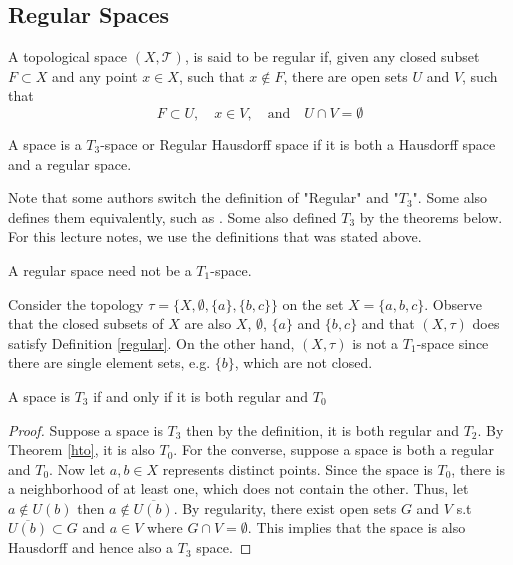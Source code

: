 \documentclass[12pt]{article} %
\begin{document}
\subsection{Regular Spaces}

\begin{definition}  \label{regular}\parencite{milewski1994topology}
    A topological space $(X, \mathcal{T})$, is said to be regular if, given any closed subset $F \subset X$ and any point $x \in X$, such that $x \notin F$, there are open sets $U$ and $V$, such that
\[
F \subset U, \quad x \in V, \quad \text{and} \quad U \cap V = \emptyset 
\]
\end{definition}

\begin{definition} 
A space is a $T_3$-space or Regular Hausdorff space if it is both a Hausdorff space and a regular space.
\end{definition}

Note that some authors switch the definition of "Regular" and "$T_3$". Some also defines them equivalently, such as \textcite{Dugundji1966}. Some  also defined $T_3$ by the theorems below. For this lecture notes, we use the definitions that was stated above.


\begin{remark}
A regular space need not be a $T_1$-space.    
\end{remark}

\begin{example}
Consider the topology $\tau = \{X, \emptyset, \{a\}, \{b, c\}\}$ on the set $X = \{a, b, c\}$. Observe that the closed subsets of $X$ are also $X$, $\emptyset$, $\{a\}$ and $\{b, c\}$ and that $(X, \tau)$ does satisfy Definition \ref{regular}. On the other hand, $(X, \tau)$ is not a $T_1$-space since there are single element sets, e.g. $\{b\}$, which are not closed.
\end{example}



\begin{theorem}
    A space is $T_3$ if and only if it is both regular and $T_0$
\end{theorem}
\begin{proof}
    Suppose a space is $T_3$ then by the definition, it is both regular and $T_2$. By Theorem \ref{hto}, it is also $T_0$. For the converse, suppose a space is both a regular and $T_0$. Now let $a,b \in X$ represents distinct points. Since the space is $T_0$, there is a neighborhood of at least one, which does not contain the other. Thus, let $a \notin U(b)$ then $a \notin \overline {U(b)}$. By regularity, there exist open sets $G$ and $V$ s.t $\overline {U(b)} \subset G$ and $a\in V$ where $G \cap V = \emptyset$. This implies that the space is also Hausdorff and hence also a $T_3$ space.
\end{proof}
\end{document}
